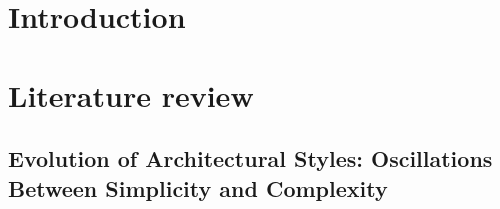 %


\begin{linenumbers}

\section{Introduction}
\label{sec:1Introduction}



\section{Literature review}
\label{sec:LiteratureReview}





\subsection{Evolution of Architectural Styles: Oscillations Between Simplicity and Complexity}
\label{subsec:TimelineArchitectureStyles}



\end{linenumbers}
